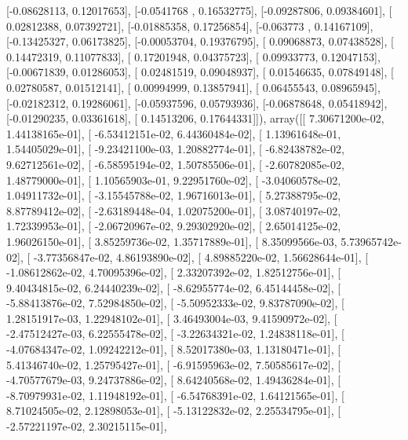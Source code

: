 \documentclass{article}
\begin{document}
       [-0.08628113,  0.12017653],
       [-0.0541768 ,  0.16532775],
       [-0.09287806,  0.09384601],
       [ 0.02812388,  0.07392721],
       [-0.01885358,  0.17256854],
       [-0.063773  ,  0.14167109],
       [-0.13425327,  0.06173825],
       [-0.00053704,  0.19376795],
       [ 0.09068873,  0.07438528],
       [ 0.14472319,  0.11077833],
       [ 0.17201948,  0.04375723],
       [ 0.09933773,  0.12047153],
       [-0.00671839,  0.01286053],
       [ 0.02481519,  0.09048937],
       [ 0.01546635,  0.07849148],
       [ 0.02780587,  0.01512141],
       [ 0.00994999,  0.13857941],
       [ 0.06455543,  0.08965945],
       [-0.02182312,  0.19286061],
       [-0.05937596,  0.05793936],
       [-0.06878648,  0.05418942],
       [-0.01290235,  0.03361618],
       [ 0.14513206,  0.17644331]]), array([[  7.30671200e-02,   1.44138165e-01],
       [ -6.53412151e-02,   6.44360484e-02],
       [  1.13961648e-01,   1.54405029e-01],
       [ -9.23421100e-03,   1.20882774e-01],
       [ -6.82438782e-02,   9.62712561e-02],
       [ -6.58595194e-02,   1.50785506e-01],
       [ -2.60782085e-02,   1.48779000e-01],
       [  1.10565903e-01,   9.22951760e-02],
       [ -3.04060578e-02,   1.04911732e-01],
       [ -3.15545788e-02,   1.96716013e-01],
       [  5.27388795e-02,   8.87789412e-02],
       [ -2.63189448e-04,   1.02075200e-01],
       [  3.08740197e-02,   1.72339953e-01],
       [ -2.06720967e-02,   9.29302920e-02],
       [  2.65014125e-02,   1.96026150e-01],
       [  3.85259736e-02,   1.35717889e-01],
       [  8.35099566e-03,   5.73965742e-02],
       [ -3.77356847e-02,   4.86193890e-02],
       [  4.89885220e-02,   1.56628644e-01],
       [ -1.08612862e-02,   4.70095396e-02],
       [  2.33207392e-02,   1.82512756e-01],
       [  9.40434815e-02,   6.24440239e-02],
       [ -8.62955774e-02,   6.45144458e-02],
       [ -5.88413876e-02,   7.52984850e-02],
       [ -5.50952333e-02,   9.83787090e-02],
       [  1.28151917e-03,   1.22948102e-01],
       [  3.46493004e-03,   9.41590972e-02],
       [ -2.47512427e-03,   6.22555478e-02],
       [ -3.22634321e-02,   1.24838118e-01],
       [ -4.07684347e-02,   1.09242212e-01],
       [  8.52017380e-03,   1.13180471e-01],
       [  5.41346740e-02,   1.25795427e-01],
       [ -6.91595963e-02,   7.50585617e-02],
       [ -4.70577679e-03,   9.24737886e-02],
       [  8.64240568e-02,   1.49436284e-01],
       [ -8.70979931e-02,   1.11948192e-01],
       [ -6.54768391e-02,   1.64121565e-01],
       [  8.71024505e-02,   2.12898053e-01],
       [ -5.13122832e-02,   2.25534795e-01],
       [ -2.57221197e-02,   2.30215115e-01],
\end{document}

